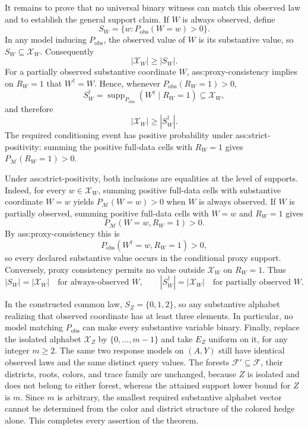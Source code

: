 It remains to prove that no universal binary witness can match this observed law and to establish the general support claim.  If \(W\) is always observed, define
\[
 S_W=\{w:P_{\mathrm{obs}}(W=w)>0\}.
\]
In any model inducing \(P_{\mathrm{obs}}\), the observed value of \(W\) is its substantive value, so \(S_W\subseteq\mathcal X_W\).  Consequently
\[
 |\mathcal X_W|\geq |S_W|.
\]
For a partially observed substantive coordinate \(W\), ass:proxy-consistency implies on \(R_W=1\) that \(W^{\dagger}=W\).  Hence, whenever \(P_{\mathrm{obs}}(R_W=1)>0\),
\[
 S_W^{\dagger}
 =\operatorname{supp}_{P_{\mathrm{obs}}}(W^{\dagger}\mid R_W=1)
 \subseteq\mathcal X_W,
\]
and therefore
\[
 |\mathcal X_W|\geq |S_W^{\dagger}|.
\]
The required conditioning event has positive probability under ass:strict-positivity: summing the positive full-data cells with \(R_W=1\) gives \(P_{\mathcal M}(R_W=1)>0\).

Under ass:strict-positivity, both inclusions are equalities at the level of supports.  Indeed, for every \(w\in\mathcal X_W\), summing positive full-data cells with substantive coordinate \(W=w\) yields \(P_{\mathcal M}(W=w)>0\) when \(W\) is always observed.  If \(W\) is partially observed, summing positive full-data cells with \(W=w\) and \(R_W=1\) gives
\[
 P_{\mathcal M}(W=w,R_W=1)>0.
\]
By ass:proxy-consistency this is
\[
 P_{\mathrm{obs}}(W^{\dagger}=w,R_W=1)>0,
\]
so every declared substantive value occurs in the conditional proxy support.  Conversely, proxy consistency permits no value outside \(\mathcal X_W\) on \(R_W=1\).  Thus
\[
 |S_W|=|\mathcal X_W|
 \quad\text{for always-observed }W,
 \qquad
 |S_W^{\dagger}|=|\mathcal X_W|
 \quad\text{for partially observed }W.
\]

In the constructed common law, \(S_Z=\{0,1,2\}\), so any substantive alphabet realizing that observed coordinate has at least three elements.  In particular, no model matching \(P_{\mathrm{obs}}\) can make every substantive variable binary.  Finally, replace the isolated alphabet \(\mathcal X_Z\) by \(\{0,\ldots,m-1\}\) and take \(E_Z\) uniform on it, for any integer \(m\geq2\).  The same two response models on \((A,Y)\) still have identical observed laws and the same distinct query values.  The forests \(\mathcal F'\subseteq\mathcal F\), their districts, roots, colors, and trace family are unchanged, because \(Z\) is isolated and does not belong to either forest, whereas the attained support lower bound for \(Z\) is \(m\).  Since \(m\) is arbitrary, the smallest required substantive alphabet vector cannot be determined from the color and district structure of the colored hedge alone.  This completes every assertion of the theorem.